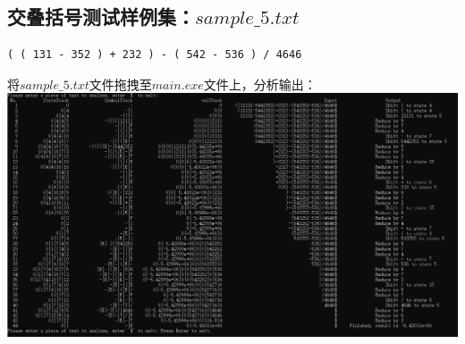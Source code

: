 \documentclass[UTF8]{ctexart}
\begin{document}
\subsection{交叠括号测试样例集：$sample\_5.txt$}
\begin{lstlisting}
( ( 131 - 352 ) + 232 ) - ( 542 - 536 ) / 4646

    \end{lstlisting}
将$sample\_5.txt$文件拖拽至$main.exe$文件上，分析输出： \\
\includegraphics[width=\textwidth]{sample_5}
\end{document}
